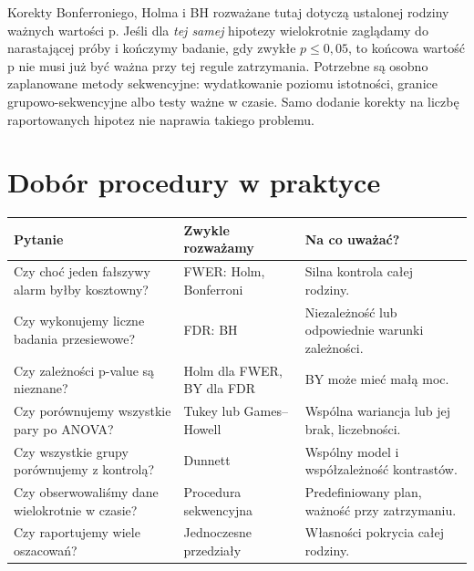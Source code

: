 \begin{uwaga}
Korekty Bonferroniego, Holma i BH rozważane tutaj
dotyczą ustalonej rodziny ważnych wartości p.
Jeśli dla \emph{tej samej} hipotezy wielokrotnie zaglądamy
do narastającej próby i kończymy badanie, gdy zwykłe
$p\le0{,}05$, to końcowa wartość p nie musi już być
ważna przy tej regule zatrzymania. Potrzebne są osobno
zaplanowane metody sekwencyjne: wydatkowanie poziomu
istotności, granice grupowo-sekwencyjne albo testy ważne
w czasie. Samo dodanie korekty na liczbę raportowanych
hipotez nie naprawia takiego problemu.
\end{uwaga}

\section{Dobór procedury w praktyce}
\begin{center}\small
\begin{tabular}{>{\raggedright\arraybackslash}p{}>{\raggedright\arraybackslash}p{}>{\raggedright\arraybackslash}p{}}
\toprule
\textbf{Pytanie} & \textbf{Zwykle rozważamy} & \textbf{Na co uważać?}\\
\midrule
Czy choć jeden fałszywy alarm byłby kosztowny? & FWER: Holm, Bonferroni & Silna kontrola całej rodziny.\\
Czy wykonujemy liczne badania przesiewowe? & FDR: BH & Niezależność lub odpowiednie warunki zależności.\\
Czy zależności p-value są nieznane? & Holm dla FWER, BY dla FDR & BY może mieć małą moc.\\
Czy porównujemy wszystkie pary po ANOVA? & Tukey lub Games--Howell & Wspólna wariancja lub jej brak, liczebności.\\
Czy wszystkie grupy porównujemy z kontrolą? & Dunnett & Wspólny model i współzależność kontrastów.\\
Czy obserwowaliśmy dane wielokrotnie w czasie? & Procedura sekwencyjna & Predefiniowany plan, ważność przy zatrzymaniu.\\
Czy raportujemy wiele oszacowań? & Jednoczesne przedziały & Własności pokrycia całej rodziny.\\
\bottomrule
\end{tabular}
\end{center}

